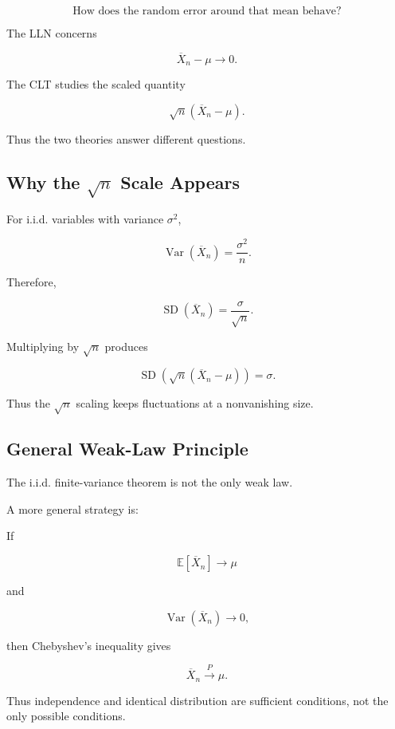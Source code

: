 \[
\boxed{
\text{How does the random error around that mean behave?}
}
\]

The LLN concerns

\[
\overline{X}_n-\mu
\to0.
\]

The CLT studies the scaled quantity

\[
\boxed{
\sqrt{n}
(\overline{X}_n-\mu).
}
\]

Thus the two theories answer different questions.

\subsection{Why the \(\sqrt{n}\) Scale Appears}
\label{subsec:sqrt-n-scale}

For i.i.d. variables with variance \(\sigma^2\),

\[
\operatorname{Var}(\overline{X}_n)
=
\frac{\sigma^2}{n}.
\]

Therefore,

\[
\operatorname{SD}(\overline{X}_n)
=
\frac{\sigma}{\sqrt{n}}.
\]

Multiplying by \(\sqrt{n}\) produces

\[
\operatorname{SD}
\left(
\sqrt{n}
(\overline{X}_n-\mu)
\right)
=
\sigma.
\]

Thus the \(\sqrt{n}\) scaling keeps fluctuations at a nonvanishing size.

\subsection{General Weak-Law Principle}
\label{subsec:general-weak-law-principle}

The i.i.d. finite-variance theorem is not the only weak law.

A more general strategy is:

If

\[
\mathbb{E}[\overline{X}_n]
\to
\mu
\]

and

\[
\operatorname{Var}(\overline{X}_n)
\to0,
\]

then Chebyshev's inequality gives

\[
\boxed{
\overline{X}_n
\xrightarrow{P}
\mu.
}
\]

Thus independence and identical distribution are sufficient conditions,
not the only possible conditions.

